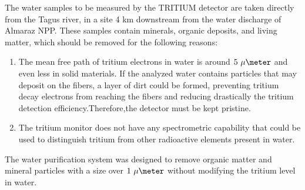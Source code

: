 The water samples to be measured by the TRITIUM detector are taken directly from the Tagus river, in a site 4 km downstream from the water discharge of Almaraz NPP. These samples contain minerals, organic deposits, and living matter, which should be removed for the following reasons:

\begin{enumerate}

\item{} The mean free path of tritium electrons in water is around $5~\mu\meter$ and even less in solid materials. If the analyzed water contains particles that may deposit on the fibers, a layer of dirt could be formed, preventing tritium decay electrons from reaching the fibers and reducing drastically the tritium detection efficiency.Therefore,the detector must be kept pristine.

\item{} The tritium monitor does not have any spectrometric capability that could be used to distinguish tritium from other radioactive elements present in water.

\end{enumerate}

The water purification system was designed to remove organic matter and mineral particles with a size over $1~\mu\meter$ without modifying the tritium level in water. 




